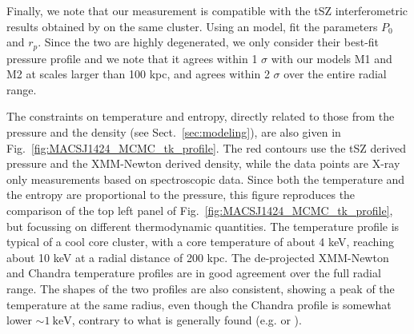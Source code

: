 \documentclass[twocolumn,traditabstract]{aa}
\begin{document}
Finally, we note that our measurement is compatible with the tSZ interferometric results obtained by \cite{bonamente2012} on the same cluster. Using an \cite{arnaud2010} model, \cite{bonamente2012} fit the parameters $P_0$ and $r_p$. Since the two are highly degenerated, we only consider their best-fit pressure profile and we note that it agrees within 1 $\sigma$ with our models M1 and M2 at scales larger than 100 kpc, and agrees within 2 $\sigma$ over the entire radial range.

The constraints on temperature and entropy, directly related to those from the pressure and the density (see Sect.~\ref{sec:modeling}), are also given in Fig.~\ref{fig:MACSJ1424_MCMC_tk_profile}. The red contours use the tSZ derived pressure and the XMM-Newton derived density, while the data points are X-ray only  measurements based on spectroscopic data. Since both the temperature and the entropy are proportional to the pressure, this figure reproduces the comparison of the top left panel of Fig.~\ref{fig:MACSJ1424_MCMC_tk_profile}, but focussing on different thermodynamic quantities. The temperature profile is typical of a cool core cluster, with a core temperature of about 4 keV, reaching about 10 keV at a radial distance of 200 kpc. The de-projected XMM-Newton and Chandra temperature profiles are in good agreement over the full radial range. The shapes of the two profiles are also consistent, showing a peak of the temperature at the same radius, even though the Chandra profile is somewhat lower $\sim \SI{1}{\kilo\electronvolt}$, contrary to what is generally found (e.g. \citealt{mahdavi2013} or \citealt{martino2014}).
\end{document}
